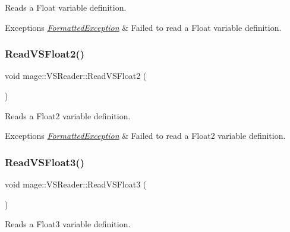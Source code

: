 Reads a Float variable definition.


\begin{DoxyExceptions}{Exceptions}
{\em \hyperlink{classmage_1_1_formatted_exception}{Formatted\+Exception}} & Failed to read a Float variable definition. \\
\hline
\end{DoxyExceptions}
\hypertarget{classmage_1_1_v_s_reader_a18c7821c219354d84f0071a5bfa8651c}{}\label{classmage_1_1_v_s_reader_a18c7821c219354d84f0071a5bfa8651c} 
\subsubsection{\texorpdfstring{Read\+V\+S\+Float2()}{ReadVSFloat2()}}
{\footnotesize\ttfamily void mage\+::\+V\+S\+Reader\+::\+Read\+V\+S\+Float2 (\begin{DoxyParamCaption}{ }\end{DoxyParamCaption})\hspace{0.3cm}{\ttfamily [private]}}

Reads a Float2 variable definition.


\begin{DoxyExceptions}{Exceptions}
{\em \hyperlink{classmage_1_1_formatted_exception}{Formatted\+Exception}} & Failed to read a Float2 variable definition. \\
\hline
\end{DoxyExceptions}
\hypertarget{classmage_1_1_v_s_reader_a63d8c0cb3108d8aa0f582a59b44db6ac}{}\label{classmage_1_1_v_s_reader_a63d8c0cb3108d8aa0f582a59b44db6ac} 
\subsubsection{\texorpdfstring{Read\+V\+S\+Float3()}{ReadVSFloat3()}}
{\footnotesize\ttfamily void mage\+::\+V\+S\+Reader\+::\+Read\+V\+S\+Float3 (\begin{DoxyParamCaption}{ }\end{DoxyParamCaption})\hspace{0.3cm}{\ttfamily [private]}}

Reads a Float3 variable definition.


